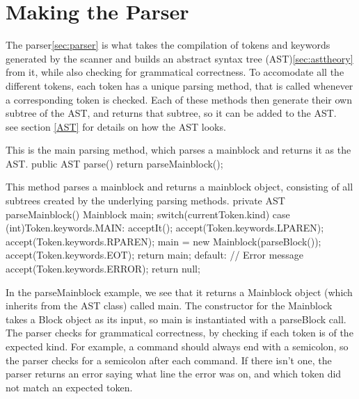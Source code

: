 \section{Making the Parser}
The parser\ref{sec:parser} is what takes the compilation of tokens and keywords generated by the scanner and builds an abstract syntax tree (AST)\ref{sec:asttheory} from it, while also checking for grammatical correctness.
To accomodate all the different tokens, each token has a unique parsing method, that is called whenever a corresponding token is checked.
Each of these methods then generate their own subtree of the AST, and returns that subtree, so it can be added to the AST. \\
see section \ref{AST} for details on how the AST looks.

\begin{source}{}{This is the main parsing method, which parses a mainblock and returns it as the AST.}{}
public AST parse()
        {
            return parseMainblock();
        }
\end{source}
\begin{source}{}{This method parses a mainblock and returns a mainblock object, consisting of all subtrees created by the underlying parsing methods.}{}
private AST parseMainblock()
        {
            Mainblock main;
            switch(currentToken.kind)
            {
                case (int)Token.keywords.MAIN:
                    acceptIt();
                    accept(Token.keywords.LPAREN);
                    accept(Token.keywords.RPAREN);
                    main = new Mainblock(parseBlock());
                    accept(Token.keywords.EOT);
                    return main;
                default:
                    // Error message
                    accept(Token.keywords.ERROR);
                    return null;
            }
        }
\end{source}
In the parseMainblock example, we see that it returns a Mainblock object (which inherits from the AST class) called main. 
The constructor for the Mainblock takes a Block object as its input, so main is instantiated with a parseBlock call. \\
The parser checks for grammatical correctness, by checking if each token is of the expected kind. 
For example, a command should always end with a semicolon, so the parser checks for a semicolon after each command. 
If there isn't one, the parser returns an error saying what line the error was on, and which token did not match an expected token.